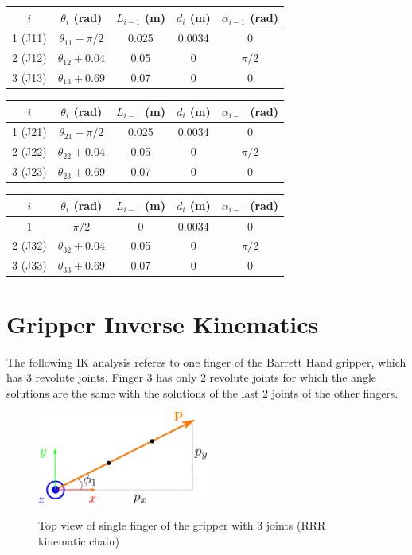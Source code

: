 \begin{center}
\begin{tabular}{ |c|c|c|c|c| } 
\hline
$i$ & $θ_i$ (rad) & $L_{i-1}$ (m) & $d_i$ (m) & $α_{i-1}$ (rad) \\
\hline
1 (J11) & $θ_{11} - π/2$ & 0.025 & 0.0034 & 0 \\
2 (J12) & $θ_{12} + 0.04$ & 0.05 & 0 & $π/2$ \\
3 (J13) & $θ_{13} + 0.69$ & 0.07 & 0 & 0 \\
\hline
\end{tabular}
\end{center}

\begin{center}
\begin{tabular}{ |c|c|c|c|c| } 
\hline
$i$ & $θ_i$ (rad) & $L_{i-1}$ (m) & $d_i$ (m) & $α_{i-1}$ (rad) \\
\hline
1 (J21) & $θ_{21} - π/2$ & 0.025 & 0.0034 & 0 \\
2 (J22) & $θ_{22} + 0.04$ & 0.05 & 0 & $π/2$ \\
3 (J23) & $θ_{23} + 0.69$ & 0.07 & 0 & 0 \\
\hline
\end{tabular}
\end{center}

\begin{center}
\begin{tabular}{ |c|c|c|c|c| } 
\hline
$i$ & $θ_i$ (rad) & $L_{i-1}$ (m) & $d_i$ (m) & $α_{i-1}$ (rad) \\
\hline
1 & $π/2$ & 0 & 0.0034 & 0 \\
2 (J32) & $θ_{32} + 0.04$ & 0.05 & 0 & $π/2$ \\
3 (J33) & $θ_{33} + 0.69$ & 0.07 & 0 & 0 \\
\hline
\end{tabular}
\end{center}

\section{Gripper Inverse Kinematics}

The following IK analysis referes to one finger of the Barrett Hand gripper, which has 3 revolute joints. Finger 3 has only 2 revolute joints for which the angle solutions are the same with the solutions of the last 2 joints of the other fingers. 

\begin{center}
\begin{figure}[!htb]
\centering
\includegraphics[width=0.5\textwidth]{images/grasper-rrr-top.png}\\
\caption{Top view of single finger of the gripper with 3 joints (RRR kinematic chain)}
\label{grasper-rrr-top}
\end{figure}
\end{center}

